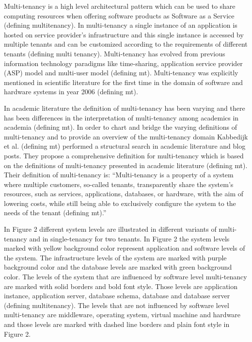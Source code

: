 \documentclass[conference]{sasmoota2017}
\begin{document}
Multi-tenancy is a high level architectural pattern which can be used to share computing resources when offering software products as Software as a Service (defining multitenancy). In multi-tenancy a single instance of an application is hosted on service provider’s infrastructure and this single instance is accessed by multiple tenants and can be customized according to the requirements of different tenants (defining multi tenancy). Multi-tenancy has evolved from previous information technology paradigms like time-sharing, application service provider (ASP) model and multi-user model (defining mt). Multi-tenancy was explicitly mentioned in scientific literature for the first time in the domain of software and hardware systems in year 2006 (defining mt). 

In academic literature the definition of multi-tenancy has been varying and there has been differences in the interpretation of multi-tenancy among academics in academia (defining mt). In order to chart and bridge the varying definitions of multi-tenancy and to provide an overview of the multi-tenancy domain Kabbedijk et al. (defining mt) performed a structural search in academic literature and blog posts. They propose a comprehensive definition for multi-tenancy which is based on the definitions of multi-tenancy presented in academic literature (defining mt). Their definition of multi-tenancy is: “Multi-tenancy is a property of a system where multiple customers, so-called tenants, transparently share the system’s resources, such as services, applications, databases, or hardware, with the aim of lowering costs, while still being able to exclusively configure the system to the needs of the tenant (defining mt).”

In Figure 2 different system levels are illustrated in different variants of multi-tenancy and in single-tenancy for two tenants. In Figure 2 the system levels marked with yellow background color represent application and software levels of the system. The infrastructure levels of the system are marked with purple background color and the database levels are marked with green background color. The levels of the system that are influenced by software level multi-tenancy are marked with solid borders and bold font style. Those levels are application instance, application server, database schema, database and database server (defining multitenancy). The levels that are not influenced by software level multi-tenancy are middleware, operating system, virtual machine and hardware and those levels are marked with dashed line borders and plain font style in Figure 2. 
\end{document}
